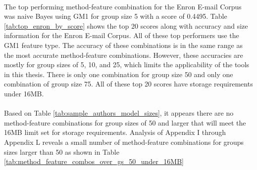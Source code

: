 \paragraph*{}  The top performing method-feature combination for the Enron E-mail Corpus was naive Bayes using GM1 for group size 5 with a score of 0.4495.  Table \ref{tab:top_enron_by_score} shows the top 20 scores along with accuracy and size information for the Enron E-mail Corpus.  All of these top performers use the GM1 feature type. The accuracy of these combinations is in the same range as the most accurate method-feature combinations. However, these accuracies are mostly for group sizes of 5, 10, and 25, which limits the applicability of the tools in this thesis.  There is only one combination for group size 50 and only one combination of group size 75.  All of these top 20 scores have storage requirements under 16MB.

\paragraph*{}Based on Table \ref{tab:sample_authors_model_sizes}, it appears there are no method-feature combinations for group sizes of 50 and larger that will meet the 16MB limit set for storage requirements.  Analysis of Appendix I through Appendix L reveals a small number of method-feature combinations for groups sizes larger than 50 as shown in Table \ref{tab:method_feature_combos_over_gs_50_under_16MB}

